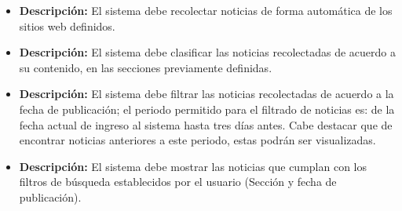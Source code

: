 
    \begin{itemize}
      \item \textbf{Descripción:} El sistema debe recolectar noticias de forma automática de los sitios web definidos.\\
    \end{itemize}
    \begin{itemize}
      \item \textbf{Descripción:} El sistema debe clasificar las noticias recolectadas de acuerdo a su contenido, en las secciones previamente definidas.\\
    \end{itemize}
    \begin{itemize}
      \item \textbf{Descripción:} El sistema debe filtrar las noticias recolectadas de acuerdo a la fecha de publicación; el periodo permitido para el filtrado 
      de noticias es: de la fecha actual de ingreso al sistema hasta tres días antes. Cabe destacar que de encontrar noticias anteriores a este periodo, estas podrán ser visualizadas.\\
    \end{itemize}
    \begin{itemize}
      \item \textbf{Descripción:} El sistema debe mostrar las noticias que cumplan con los filtros de búsqueda establecidos por el usuario 
      (Sección y fecha de publicación).\\
    \end{itemize}

